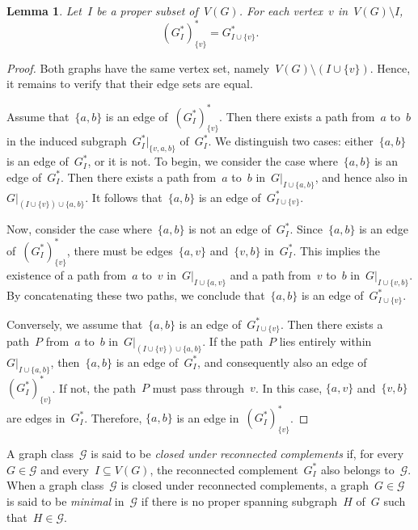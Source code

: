 \documentclass[10pt]{amsart}
\theoremstyle{plain}
\newtheorem{lemma}[theorem]{Lemma}
\numberwithin{equation}{section}
\theoremstyle{definition}
\newcommand{\cG}{\mathcal{G}}
\begin{document}
\begin{lemma}\label{lemma:rec}
    Let~$I$ be a proper subset of~$V(G)$.
    For each vertex~$v$ in~$V(G) \setminus I$,
    $$
        (G^\ast_I)^\ast_{\{v\}} = G^\ast_{I \cup \{v\}}.
    $$
\end{lemma}
\begin{proof}
    Both graphs have the same vertex set, namely~$V(G) \setminus (I \cup \{v\})$.
    Hence, it remains to verify that their edge sets are equal.
    
    Assume that~$\{a,b\}$ is an edge of~$(G^\ast_I)^\ast_{\{v\}}$.
    Then there exists a path from~$a$ to~$b$ in the induced subgraph~$G^\ast_I\vert_{\{v,a,b\}}$ of~$G^\ast_I$.  
    We distinguish two cases: either~$\{a,b\}$ is an edge of~$G^\ast_I$, or it is not.
    To begin, we consider the case where~$\{a,b\}$ is an edge of~$G^\ast_I$.
    Then there exists a path from~$a$ to~$b$ in~$G\vert_{I \cup \{a,b\}}$, and hence also in~$G\vert_{(I \cup \{v\}) \cup \{a,b\}}$.
    It follows that~$\{a,b\}$ is an edge of~$G^\ast_{I \cup \{v\}}$.
    
    Now, consider the case where~$\{a,b\}$ is not an edge of~$G^\ast_I$.  
    Since~$\{a,b\}$ is an edge of~$(G^\ast_I)^\ast_{\{v\}}$, there must be edges~$\{a,v\}$ and~$\{v,b\}$ in~$G^\ast_I$.  
    This implies the existence of a path from~$a$ to~$v$ in~$G\vert_{I \cup \{a,v\}}$ and a path from~$v$ to~$b$ in~$G\vert_{I \cup \{v,b\}}$.  
    By concatenating these two paths, we conclude that~$\{a,b\}$ is an edge of~$G^\ast_{I \cup \{v\}}$.
    
    Conversely, we assume that~$\{a,b\}$ is an edge of~$G^\ast_{I \cup \{v\}}$.
    Then there exists a path~$P$ from~$a$ to~$b$ in~$G\vert_{(I \cup \{v\}) \cup \{a,b\}}$.
    If the path~$P$ lies entirely within~$G\vert_{I \cup \{a,b\}}$, then~$\{a,b\}$ is an edge of~$G^\ast_I$, and consequently also an edge of~$(G^\ast_I)^\ast_{\{v\}}$.
    If not, the path~$P$ must pass through~$v$.
    In this case, $\{a,v\}$ and~$\{v,b\}$ are edges in~$G^\ast_I$.
    Therefore, $\{a,b\}$ is an edge in~$(G^\ast_I)^\ast_{\{v\}}$.
\end{proof}

A graph class~$\cG$ is said to be \emph{closed under reconnected complements} if, for every~$G \in \cG$ and every~$I \subseteq V(G)$, the reconnected complement~$G^\ast_I$ also belongs to~$\cG$.
When a graph class~$\cG$ is closed under reconnected complements, a graph~$G \in \cG$ is said to be \emph{minimal} in~$\cG$ if there is no proper spanning subgraph~$H$ of~$G$ such that~$H \in \cG$.
\end{document}
